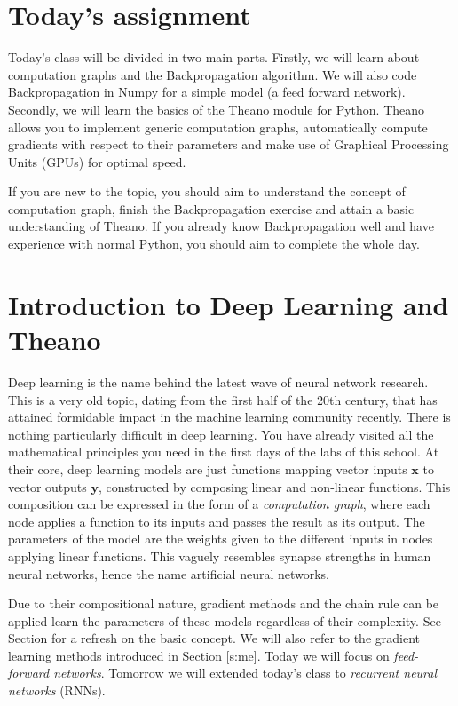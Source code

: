 \section{Today's assignment}
Today's class will be divided in two main parts. Firstly, we will learn about
computation graphs and the Backpropagation algorithm. We will also code
Backpropagation in Numpy for a simple model (a feed forward network). Secondly,
we will learn the basics of the Theano module for Python. Theano allows you to
implement  generic computation graphs, automatically compute gradients with
respect to their parameters and make use of Graphical Processing Units (GPUs)
for optimal speed. 

If you are new to the topic, you should aim to understand the concept of computation graph, 
finish the Backpropagation exercise and attain a basic understanding of Theano.
If you already know Backpropagation well and have experience with normal
Python, you should aim to complete the whole day. 

\section{Introduction to Deep Learning and Theano}

Deep learning is the name behind the latest wave of neural network research.
This is a very old topic, dating from the first half of the 20th century, that
has attained formidable impact in the machine learning community recently. 
There is nothing particularly difficult in deep learning. You have already
visited all the mathematical principles you need in the first days of the
labs of this school. At their core, deep learning models are just functions
mapping vector inputs $\mathbf{x}$ to vector outputs $\mathbf{y}$, constructed by
composing linear and non-linear functions. This composition can be expressed in
the form of a \textit{computation graph}, where each node applies a function to
its inputs and passes the result as its output. The parameters of the model are
the weights given to the different inputs in nodes applying linear
functions. This vaguely resembles synapse strengths in human neural networks,
hence the name artificial neural networks. 

Due to their compositional nature, gradient methods and the chain rule can be
applied learn the parameters of these models regardless of their complexity.
See Section \label{gradient_methods} for a refresh on the basic concept. We
will also refer to the gradient learning methods introduced in Section
\ref{s:me}. Today we will focus on \textit{feed-forward networks}. Tomorrow we will
extended today's class to \textit{recurrent neural networks} (RNNs).  

